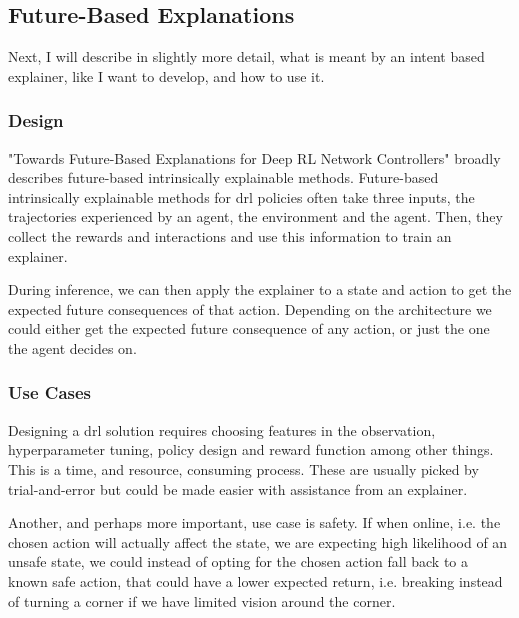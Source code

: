 \documentclass[UKenglish]{uiomasterthesis}
\begin{document}
\subsection{Future-Based Explanations}
Next, I will describe in slightly more detail, what is meant by an intent based explainer, like I want to develop, and how to use it.

\subsubsection{Design}
"Towards Future-Based Explanations for Deep RL Network Controllers"\cite{10.1145/3626570.3626607} broadly describes future-based intrinsically explainable methods. Future-based intrinsically explainable methods for \ac{drl} policies often take three inputs, the trajectories experienced by an agent, the environment and the agent. Then, they collect the rewards and interactions and use this information to train an explainer.

During inference, we can then apply the explainer to a state and action to get the expected future consequences of that action. Depending on the architecture we could either get the expected future consequence of any action, or just the one the agent decides on.

\subsubsection{Use Cases}

Designing a \ac{drl} solution requires choosing features in the observation, hyperparameter tuning, policy design and reward function among other things. This is a time, and resource, consuming process. These are usually picked by trial-and-error but could be made easier with assistance from an explainer.

Another, and perhaps more important, use case is safety. If when online, i.e. the chosen action will actually affect the state, we are expecting high likelihood of an unsafe state, we could instead of opting for the chosen action fall back to a known safe action, that could have a lower expected return, i.e. breaking instead of turning a corner if we have limited vision around the corner.
\end{document}
